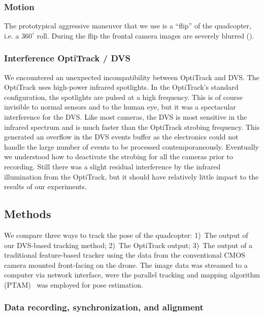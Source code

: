 \subsubsection{Motion}

The prototypical aggressive maneuver that we use is a ``flip'' of
the quadcopter, i.e. a $360^{\circ}$ roll. During the flip the frontal
camera images are severely blurred (). 




\subsubsection{Interference OptiTrack / DVS}

We encountered an unexpected incompatibility between OptiTrack and
DVS. The OptiTrack uses high-power infrared spotlights. In the OptiTrack's
standard configuration, the spotlights are pulsed at a high frequency.
This is of course invisible to normal sensors and to the human eye,
but it was a spectacular interference for the DVS. Like most cameras,
the DVS is most sensitive in the infrared spectrum and is much faster
than the OptiTrack strobing frequency. This generated an overflow
in the DVS events buffer as the electronics could not handle the large
number of events to be processed contemporaneously. Eventually we
understood how to deactivate the strobing for all the cameras prior
to recording. Still there was a slight residual interference by the
infrared illumination from the OptiTrack, but it should have relatively
little impact to the results of our experiments.


\subsection{Methods}

We compare three ways to track the pose of the quadcopter: 1)~The
output of our DVS-based \ALM tracking method; 2)~The OptiTrack output;
3)~The output of a traditional feature-based tracker using the data
from the conventional CMOS camera mounted front-facing on the drone.
The image data was streamed to a computer via network interface, were
the parallel tracking and mapping algorithm (PTAM)~\cite{PTAM} was
employed for pose estimation.


\subsubsection{Data recording, synchronization, and alignment\label{sec:datarecording}}

